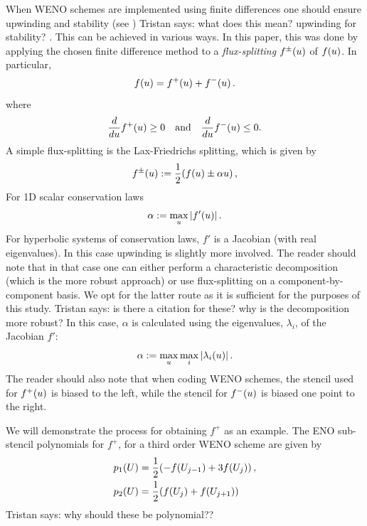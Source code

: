 \documentclass[final]{amsart}
\newcommand{\tristan}[1]{{\color{purple} Tristan says:  #1 }}
\numberwithin{equation}{section}
\begin{document}
\begin{Rem}
  When WENO schemes are implemented using finite differences one
  should ensure upwinding and stability (see
  \cite{shu1998essentially}) \tristan{what does this mean? upwinding
    for stability?}.  This can be achieved in various ways.  In this
  paper, this was done by applying the chosen finite difference method
  to a \textit{flux-splitting} $f^{\pm}\!\left({u}\right)$ of $f\!\left({u}\right)$.  In
  particular,
  \begin{equation}
    f\!\left({u}\right)= f^+\!\left({u}\right) + f^-\!\left({u}\right).
  \end{equation}
  where 
  \begin{equation}
    \frac{d}{du}f^+\!\left({u}\right) \geq 0 \quad \text{and}\quad \frac{d}{du}f^-\!\left({u}\right) \leq 0.
  \end{equation}
  A simple flux-splitting is the Lax-Friedrichs splitting, which is given by 
  \begin{equation}
    f^{\pm}\!\left({u}\right):=\frac{1}{2}\!\left({f\!\left({u}\right)\pm \alpha u}\right),
  \end{equation}
  For 1D scalar conservation laws
  \begin{equation}
    \alpha:=\max_{u}\left|f'\!\left({u}\right)\right|.
  \end{equation}
  For hyperbolic systems of conservation laws, ${f}'$ is a Jacobian
  (with real eigenvalues).  In this case upwinding is slightly more
  involved. The reader should note that in that case one can either
  perform a characteristic decomposition (which is the more robust
  approach) or use flux-splitting on a component-by-component basis.
  We opt for the latter route as it is sufficient for the purposes of
  this study. \tristan{is there a citation for these? why is the
    decomposition more robust?}  In this case, $\alpha$ is calculated
  using the eigenvalues, $\lambda_i$, of the Jacobian ${f}'$:
  \begin{equation}
    \alpha := \max_{u} \max_{i} \left|\lambda_i\!\left({u}\right)\right|.
  \end{equation}
  The reader should also note that when coding WENO schemes, the
  stencil used for $f^+\!\left({u}\right)$ is biased to the left, while the
  stencil for $f^-\!\left({u}\right)$ is biased one point to the right.
\end{Rem}
We will demonstrate the process for obtaining $f^+$ as an example. The
ENO sub-stencil polynomials for $f^+$, for a third order WENO scheme
are given by
\begin{equation}
\begin{aligned}
p_1\qp{U} &= \frac{1}{2}\qp{-f\qp{U_{j-1}} + 3f\qp{U_j}},\\
p_2\qp{U} &= \frac{1}{2}\qp{f\qp{U_{j}} + f\qp{U_{j+1}}}
\end{aligned}
\end{equation}
\tristan{why should these be polynomial??}
\end{document}
